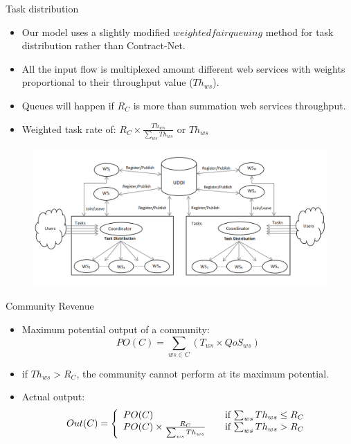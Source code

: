 \documentclass{beamer}
\begin{document}
\begin{frame}{Task distribution}
    \begin{itemize}
        \item Our model uses a slightly modified $weighted fair queuing$ method for task distribution rather than Contract-Net.
        \item All the input flow is multiplexed amount different web services with weights proportional to their throughput value ($Th_{ws}$).
        \item Queues will happen if $R_C$ is more than summation web services throughput.
        \item Weighted task rate of: $R_C \times \frac{Th_{ws}}{\sum_{ws}{Th_{ws}}}$ or $Th_{ws}$
    \end{itemize}
    \begin{figure}[htbp]
        \centering
        \includegraphics[width=0.8 \columnwidth]{figures/community.png}
    \end{figure}    
\end{frame}

\begin{frame}{Community Revenue}
    \begin{itemize}
        \item Maximum potential output of a community:
            \begin{equation*}
                PO(C) = \sum_{ws \in C}{(T_{ws} \times QoS_{ws})}
            \end{equation*}
        \item if $Th_{ws} > R_C$, the community cannot perform at its maximum potential.
        \item Actual output:
            \begin{equation}\label{out_c}
                Out(C) = \left\{
                  \begin{array}{l l}
                    PO(C) & \quad \text{if $\sum_{ws}{Th_{ws}} \leq R_{C}$}\\
                    PO(C) \times \frac{R_{C}}{\sum_{ws}{Th_{ws}}} & \quad \text{if $\sum_{ws}{Th_{ws}} > R_{C}$}
                  \end{array} \right.
            \end{equation}
    \end{itemize}
\end{frame}
\end{document}

